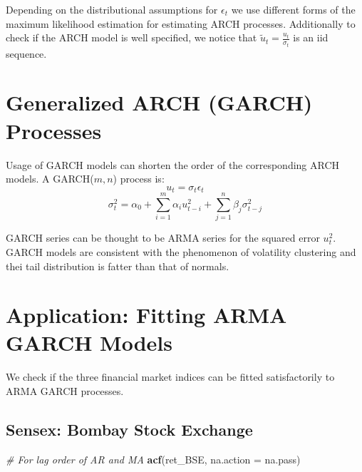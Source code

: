 \documentclass[11pt,]{article}
\newenvironment{Shaded}{\begin{snugshade}}{\end{snugshade}}
\newcommand{\KeywordTok}[1]{\textcolor[rgb]{0.13,0.29,0.53}{\textbf{#1}}}
\newcommand{\DataTypeTok}[1]{\textcolor[rgb]{0.13,0.29,0.53}{#1}}
\newcommand{\CommentTok}[1]{\textcolor[rgb]{0.56,0.35,0.01}{\textit{#1}}}
\newcommand{\NormalTok}[1]{#1}
\begin{document}
Depending on the distributional assumptions for \(\epsilon_t\) we use
different forms of the maximum likelihood estimation for estimating ARCH
processes. Additionally to check if the ARCH model is well specified, we
notice that \(\tilde{u}_t = \frac{u_t}{\sigma_t}\) is an iid sequence.

\section{Generalized ARCH (GARCH)
Processes}\label{generalized-arch-garch-processes}

Usage of GARCH models can shorten the order of the corresponding ARCH
models. A GARCH(\(m,n\)) process is: \[u_t = \sigma_t \epsilon_t\]
\[\sigma_t^2 = \alpha_0 + \sum_{i=1}^m \alpha_iu_{t-i}^2 + \sum_{j=1}^n \beta_j\sigma_{t-j}^2\]

GARCH series can be thought to be ARMA series for the squared error
\(u_t^2\). GARCH models are consistent with the phenomenon of volatility
clustering and thei tail distribution is fatter than that of normals.

\section{Application: Fitting ARMA GARCH
Models}\label{application-fitting-arma-garch-models}

We check if the three financial market indices can be fitted
satisfactorily to ARMA GARCH processes.

\subsection{Sensex: Bombay Stock
Exchange}\label{sensex-bombay-stock-exchange}

\begin{Shaded}
\begin{Highlighting}[]
\CommentTok{# For lag order of AR and MA}
\KeywordTok{acf}\NormalTok{(ret_BSE, }\DataTypeTok{na.action =}\NormalTok{ na.pass)}
\end{Highlighting}
\end{Shaded}
\end{document}
